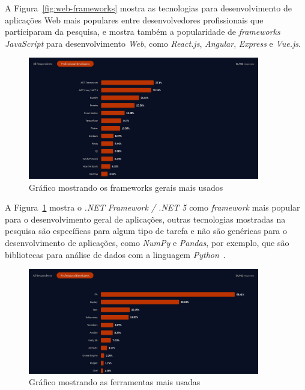 \documentclass[12pt]{article}
\begin{document}
A Figura~\ref{fig:web-frameworks} mostra as tecnologias para desenvolvimento de aplicações Web mais populares entre desenvolvedores
profissionais que participaram da pesquisa, e mostra também a popularidade de \textit{frameworks JavaScript} para
desenvolvimento \textit{Web}, como \textit{React.js}, \textit{Angular}, \textit{Express} e \textit{Vue.js}.

\begin{figure}[h]
  \centering
  \includegraphics[width=0.9\textwidth]{stackoverflow/general_framework_usage.png}
  \caption{Gráfico mostrando os frameworks gerais mais usados}\label{fig:general-frameworks}
\end{figure}

A Figura~\ref{fig:general-frameworks} mostra o \textit{.NET Framework / .NET 5} como \textit{framework}
mais popular para o desenvolvimento geral de aplicações, outras tecnologias mostradas na pesquisa são específicas
para algum tipo de tarefa e não são genéricas para o desenvolvimento de aplicações, como \textit{NumPy} e \textit{Pandas}, por exemplo, que
são bibliotecas para análise de dados com a linguagem \textit{Python}~\cite{PandasPython}.

\begin{figure}[h]
  \centering
  \includegraphics[width=0.9\textwidth]{stackoverflow/used_tools.png}
  \caption{Gráfico mostrando as ferramentas mais usadas}\label{fig:tools}
\end{figure}
\end{document}
